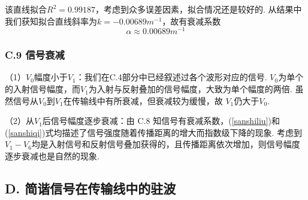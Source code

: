 \documentclass[UTF8]{ctexart}
\begin{document}
\begin{figure}[H]
\end{figure}
该直线拟合$R^2=0.99187$，考虑到众多误差因素，拟合情况还是较好的. 从结果中我们获知拟合直线斜率为$k=-0.00689m^{-1}$，故有衰减系数
\[\alpha\approx 0.00689m^{-1}\]
\subsubsection*{C.9 信号衰减}
（1）$V_0$幅度小于$V_1$：我们在C.4部分中已经叙述过各个波形对应的信号. $V_0$为单个的入射信号幅度，而$V_1$为入射与反射叠加的信号幅度，大致为单个幅度的两倍. 虽然信号从$V_0$到$V_1$在传输线中有所衰减，但衰减较为缓慢，故
$V_1$仍大于$V_0$.

（2）从$V_1$后信号幅度逐步衰减：由 C.8 知信号有衰减系数，(\ref{sanshiliu})和(\ref{sanshiqi})式均描述了信号强度随着传播距离的增大而指数级下降的现象. 考虑到$V_1-V_6$均是入射信号和反射信号叠加获得的，且传播距离依次增加，则信号幅度逐步衰减也是自然的现象.

\subsection*{D. 简谐信号在传输线中的驻波}
\end{document}
